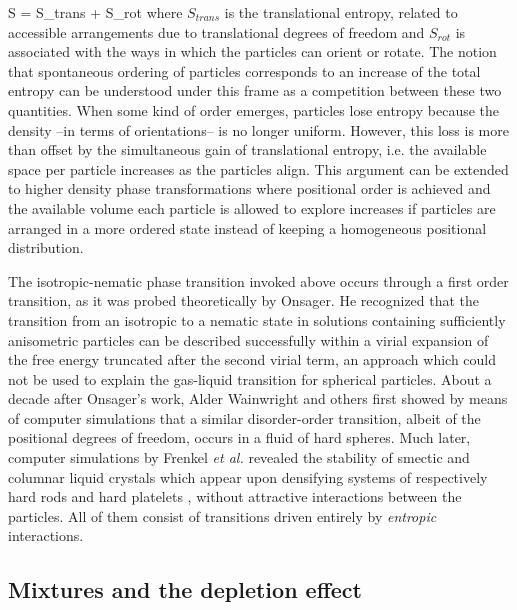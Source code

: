 \beq
S = S_{trans} + S_{rot}
\eeq
where $S_{trans}$ is the translational entropy, related to accessible arrangements due to translational degrees of freedom and $S_{rot}$ is associated with the ways in which the particles can orient or rotate. The notion that spontaneous ordering of particles corresponds to an increase of the total entropy can be understood under this frame as a competition between these two quantities. When some kind of order emerges, particles lose entropy because the density --in terms of orientations-- is no longer uniform. However, this loss is more than offset by the simultaneous gain of translational entropy, i.e.  the available space per particle increases as the particles align. This argument can be extended to higher density phase transformations where positional order is achieved and the available volume each particle is allowed to explore increases if particles are arranged in a more ordered state instead of keeping a homogeneous positional distribution.

The isotropic-nematic phase transition invoked above occurs through a first order transition, as it was probed theoretically by Onsager. He recognized that the transition from an isotropic to a nematic state in solutions containing sufficiently anisometric particles can be described successfully  within a virial expansion of the free energy truncated after the second virial term, an approach which could not be used to explain the gas-liquid transition for spherical particles. About a decade after Onsager's work, Alder Wainwright and others \cite{ALDER57,WOOD57} first showed by means of computer simulations that a similar disorder-order transition, albeit of the positional degrees of freedom, occurs in a fluid of hard spheres. Much later, computer simulations by Frenkel {\em et al.}  revealed the stability of smectic and columnar liquid crystals which appear upon densifying systems of respectively hard rods \cite{Frenkel88} and hard platelets \cite{FrenkelLiqcryst,Veerman},  without  attractive interactions between the particles. All of them consist of transitions driven entirely by {\em entropic} interactions.




\subsection{Mixtures and the depletion effect}

